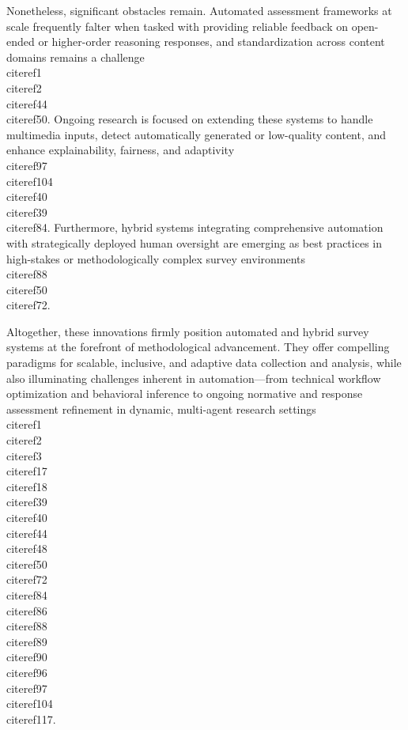\documentclass[11pt]{article}
\begin{document}
Nonetheless, significant obstacles remain. Automated assessment frameworks at scale frequently falter when tasked with providing reliable feedback on open-ended or higher-order reasoning responses, and standardization across content domains remains a challenge~\\cite{ref1}\\cite{ref2}\\cite{ref44}\\cite{ref50}. Ongoing research is focused on extending these systems to handle multimedia inputs, detect automatically generated or low-quality content, and enhance explainability, fairness, and adaptivity~\\cite{ref97}\\cite{ref104}\\cite{ref40}\\cite{ref39}\\cite{ref84}. Furthermore, hybrid systems integrating comprehensive automation with strategically deployed human oversight are emerging as best practices in high-stakes or methodologically complex survey environments~\\cite{ref88}\\cite{ref50}\\cite{ref72}.

Altogether, these innovations firmly position automated and hybrid survey systems at the forefront of methodological advancement. They offer compelling paradigms for scalable, inclusive, and adaptive data collection and analysis, while also illuminating challenges inherent in automation—from technical workflow optimization and behavioral inference to ongoing normative and response assessment refinement in dynamic, multi-agent research settings~\\cite{ref1}\\cite{ref2}\\cite{ref3}\\cite{ref17}\\cite{ref18}\\cite{ref39}\\cite{ref40}\\cite{ref44}\\cite{ref48}\\cite{ref50}\\cite{ref72}\\cite{ref84}\\cite{ref86}\\cite{ref88}\\cite{ref89}\\cite{ref90}\\cite{ref96}\\cite{ref97}\\cite{ref104}\\cite{ref117}.
\end{document}
